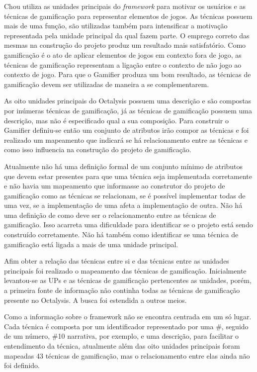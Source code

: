 Chou utiliza as unidades principais do \textit{framework} para motivar os usuários e as técnicas de gamificação para representar elementos de jogos. As técnicas possuem mais de uma função, são utilizadas também para intensificar a motivação representada pela unidade principal da qual fazem parte. O emprego correto das mesmas na construção do projeto produz um resultado mais satisfatório. Como gamificação é o ato de aplicar elementos de jogos em contexto fora de jogo, as técnicas de gamificação representam a ligação entre o contexto de não jogo ao contexto de jogo. Para que o Gamifier produza um bom resultado, as técnicas de gamificação devem ser utilizadas de maneira a se complementarem.

As oito unidades principais do Octalysis possuem uma descrição e são compostas por inúmeras técnicas de gamificação, já as técnicas de gamificação possuem uma descrição, mas não é especificado qual a sua composição.  Para construir o Gamifier definiu-se então um conjunto de atributos irão compor as técnicas e foi realizado um mapeamento que indicará se há relacionamento entre as técnicas e como isso influencia na construção do projeto de gamificação.

Atualmente não há uma definição formal de um conjunto mínimo de atributos que devem estar presentes para que uma técnica seja implementada corretamente e não havia um mapeamento que informasse ao construtor do projeto de gamificação como as técnicas se relacionam, se é possível implementar todas de uma vez, se a implementação de uma afeta a implementação de outra. Não há uma definição de como deve ser o relacionamento entre as técnicas de gamificação. Isso acarreta uma dificuldade para identificar se o projeto está sendo construído corretamente. Não há também como identificar se uma técnica de gamificação está ligada a mais de uma unidade principal. 

Afim obter a relação das técnicas entre si e das técnicas entre as unidades principais foi realizado o mapeamento das técnicas de gamificação. Inicialmente levantou-se as UPs e as técnicas de gamificação pertencentes as unidades, porém, a primeira fonte de informação não continha todas as técnicas de gamificação presente no Octalysis. A busca foi estendida a outros meios.

Como a informação sobre o framework não se encontra centrada em um só lugar. Cada técnica é composta por um identificador representado por uma \#, seguido de um número, \#10 narrativa, por exemplo, e uma descrição, para facilitar o entendimento da técnica, atualmente além das oito unidades principais foram mapeadas 43 técnicas de gamificação, mas o relacionamento entre elas ainda não foi definido.

